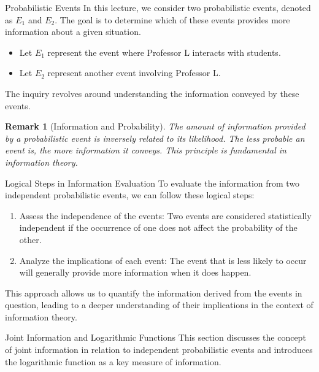 \documentclass[12pt,a4paper]{article}
\newtheorem{remark}{Remark}[section]
\begin{document}
\begin{section}{Probabilistic Events}
In this lecture, we consider two probabilistic events, denoted as \( E_1 \) and \( E_2 \). The goal is to determine which of these events provides more information about a given situation.

\begin{itemize}
    \item Let \( E_1 \) represent the event where Professor L interacts with students.
    \item Let \( E_2 \) represent another event involving Professor L.
\end{itemize}

The inquiry revolves around understanding the information conveyed by these events. 

\begin{remark}[Information and Probability]
The amount of information provided by a probabilistic event is inversely related to its likelihood. The less probable an event is, the more information it conveys. This principle is fundamental in information theory.
\end{remark}

\begin{section}{Logical Steps in Information Evaluation}
To evaluate the information from two independent probabilistic events, we can follow these logical steps:

\begin{enumerate}
    \item Assess the independence of the events: Two events are considered statistically independent if the occurrence of one does not affect the probability of the other.
    \item Analyze the implications of each event: The event that is less likely to occur will generally provide more information when it does happen.
\end{enumerate}

This approach allows us to quantify the information derived from the events in question, leading to a deeper understanding of their implications in the context of information theory.
\end{section}

\begin{section}{Joint Information and Logarithmic Functions}
This section discusses the concept of joint information in relation to independent probabilistic events and introduces the logarithmic function as a key measure of information.


\end{section}
\end{section}
\end{document}
